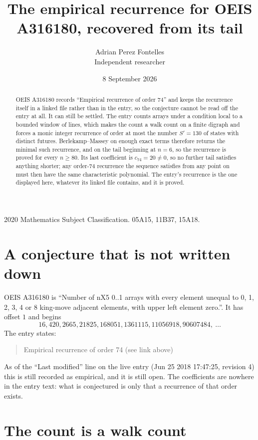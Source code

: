 \documentclass[11pt,a4paper]{article}
\title{The empirical recurrence for OEIS A316180, recovered from its tail}
\author{Adrian Perez Fontelles\\ \small Independent researcher}
\date{8 September 2026}
\theoremstyle{plain}
\theoremstyle{definition}
\begin{document}
\maketitle

\begin{abstract}
OEIS A316180 records ``Empirical recurrence of order $74$'' and keeps the recurrence itself in
a linked file rather than in the entry, so the conjecture cannot be read off the entry at all.
It can still be settled. The entry counts arrays under a condition local to a bounded window of
lines, which makes the count a walk count on a finite digraph and forces a monic integer
recurrence of order at most the number $S'=130$ of states with distinct futures. Berlekamp--Massey on
enough exact terms therefore returns the minimal such recurrence, and on the tail beginning at $n=6$, so the recurrence is proved for every $n\ge80$.
Its last coefficient is $c_{74}=20\neq0$, so no further tail satisfies anything
shorter; any order-$74$ recurrence the sequence satisfies from any point on must then have
the same characteristic polynomial. The entry's recurrence is the one displayed here, whatever
its linked file contains, and it is proved.
\end{abstract}

\noindent\small 2020 Mathematics Subject Classification. 05A15, 11B37, 15A18.\normalsize

\section{A conjecture that is not written down}

OEIS A316180 is ``Number of nX5 0..1 arrays with every element unequal to 0, 1, 2, 3, 4 or 8 king-move adjacent elements, with upper left element zero.''. It has offset $1$ and begins
\[
16, 420, 2665, 21825, 168051, 1361115, 11056918, 90607484,\ \dots
\]
The entry states:
\begin{quote}
Empirical recurrence of order 74 (see link above)
\end{quote}
As of the ``Last modified'' line on the live entry (Jun 25 2018 17:47:25, revision 4)
this is still recorded as empirical, and it is still open. The coefficients are nowhere in the
entry text: what is conjectured is only that a recurrence of that order exists.

\section{The count is a walk count}
\end{document}
